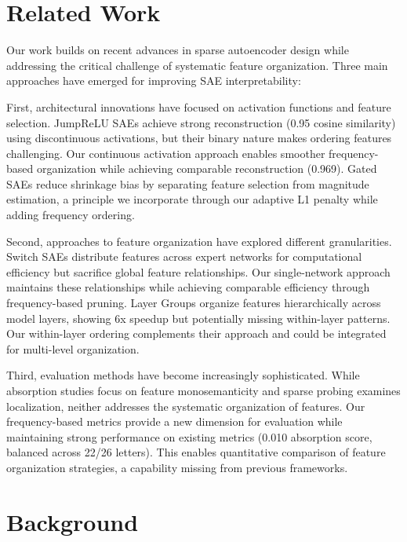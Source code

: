 \documentclass{article} %
\begin{document}
\section{Related Work}
\label{sec:related}
Our work builds on recent advances in sparse autoencoder design while addressing the critical challenge of systematic feature organization. Three main approaches have emerged for improving SAE interpretability:

First, architectural innovations have focused on activation functions and feature selection. JumpReLU SAEs \cite{rajamanoharanJumpingAheadImproving2024} achieve strong reconstruction (0.95 cosine similarity) using discontinuous activations, but their binary nature makes ordering features challenging. Our continuous activation approach enables smoother frequency-based organization while achieving comparable reconstruction (0.969). Gated SAEs \cite{rajamanoharanImprovingDictionaryLearning2024} reduce shrinkage bias by separating feature selection from magnitude estimation, a principle we incorporate through our adaptive L1 penalty while adding frequency ordering.

Second, approaches to feature organization have explored different granularities. Switch SAEs \cite{mudideEfficientDictionaryLearning2024a} distribute features across expert networks for computational efficiency but sacrifice global feature relationships. Our single-network approach maintains these relationships while achieving comparable efficiency through frequency-based pruning. Layer Groups \cite{ghilardiEfficientTrainingSparse2024a} organize features hierarchically across model layers, showing 6x speedup but potentially missing within-layer patterns. Our within-layer ordering complements their approach and could be integrated for multi-level organization.

Third, evaluation methods have become increasingly sophisticated. While absorption studies \cite{chaninAbsorptionStudyingFeature2024} focus on feature monosemanticity and sparse probing \cite{gurneeFindingNeuronsHaystack2023} examines localization, neither addresses the systematic organization of features. Our frequency-based metrics provide a new dimension for evaluation while maintaining strong performance on existing metrics (0.010 absorption score, balanced across 22/26 letters). This enables quantitative comparison of feature organization strategies, a capability missing from previous frameworks.

\section{Background}
\label{sec:background}
\end{document}
